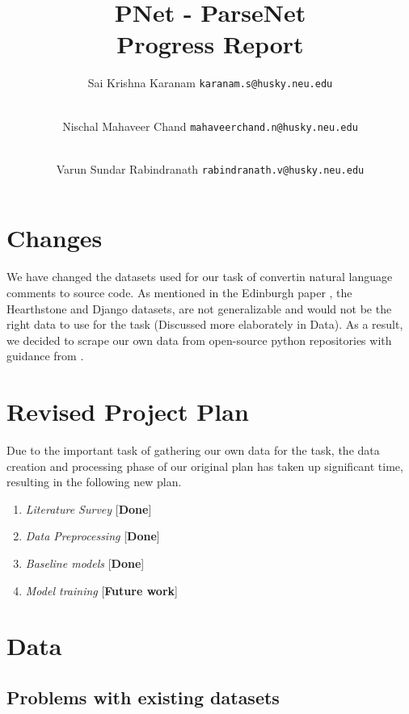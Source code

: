 \documentclass{IEEEtran}
\title{\textbf{PNet - ParseNet \\ \large{Progress Report}}}
\author{
    Sai Krishna Karanam 
    \texttt{karanam.s@husky.neu.edu}
    \and \\
    Nischal Mahaveer Chand 
    \texttt{mahaveerchand.n@husky.neu.edu}
    \and \\
    Varun Sundar Rabindranath 
    \texttt{rabindranath.v@husky.neu.edu}
}
\date{}
\begin{document}
    \maketitle

    \section{Changes}

    We have changed the datasets used for our task of convertin natural language comments to 
    source code. As mentioned in the 
    Edinburgh paper \cite{barone2017}, the Hearthstone and Django datasets, are not generalizable and
    would not be the right data to use for the task (Discussed more elaborately in Data). As a result, we decided to scrape our own data from open-source python repositories with guidance from
    \cite{barone2017}.

    \section{Revised Project Plan}
    Due to the important task of gathering our own data for the task, the data creation and 
    processing phase of our original plan has taken up significant time, resulting in the
    following new plan.
    \begin{enumerate}
        \item \textit{Literature Survey} \hfill [\textbf{Done}]
        \item \textit{Data Preprocessing} \hfill [\textbf{Done}]
        \item \textit{Baseline models} \hfill [\textbf{Done}]
        \item \textit{Model training} \hfill [\textbf{Future work}]
    \end{enumerate}

    \section{Data}

      \subsection{Problems with existing datasets}
\end{document}
